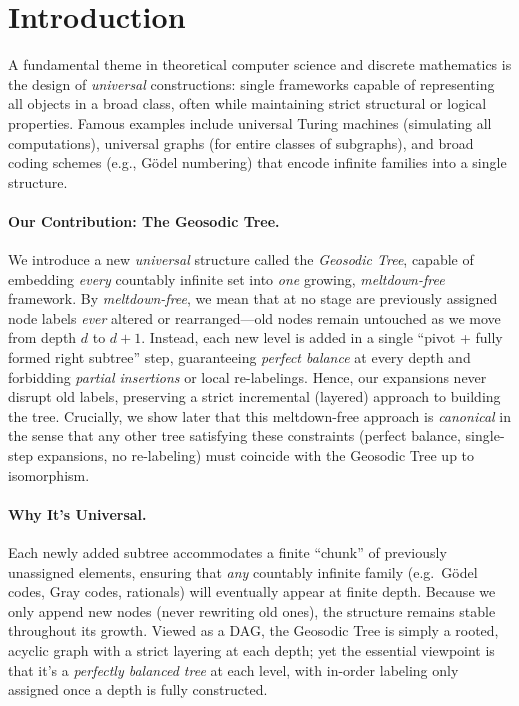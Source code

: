 \documentclass[11pt]{article}
\theoremstyle{definition}
\theoremstyle{remark}
\begin{document}
\section{Introduction}
\label{sec:intro}

A fundamental theme in theoretical computer science and discrete mathematics 
is the design of \emph{universal} constructions: single frameworks capable 
of representing all objects in a broad class, often while maintaining 
strict structural or logical properties. Famous examples include 
universal Turing machines (simulating all computations), universal graphs 
(for entire classes of subgraphs), and broad coding schemes 
(e.g., G\"odel numbering) that encode infinite families into a single structure.

\paragraph{Our Contribution: The Geosodic Tree.}
We introduce a new \emph{universal} structure called the \emph{Geosodic Tree}, 
capable of embedding \emph{every} countably infinite set into \emph{one} 
growing, \emph{meltdown-free} framework. By \emph{meltdown-free}, we mean 
that at no stage are previously assigned node labels \emph{ever} altered 
or rearranged---old nodes remain untouched as we move from depth $d$ 
to $d+1$. Instead, each new level is added in a single ``pivot + fully formed 
right subtree'' step, guaranteeing \emph{perfect balance} at every depth 
and forbidding \emph{partial insertions} or local re-labelings. 
Hence, our expansions never disrupt old labels, preserving a strict 
incremental (layered) approach to building the tree.  Crucially, we show later that this meltdown-free
approach is \emph{canonical} in the sense that any other tree satisfying
these constraints (perfect balance, single-step expansions, no re-labeling)
must coincide with the Geosodic Tree up to isomorphism.

\paragraph{Why It’s Universal.}
Each newly added subtree accommodates a finite ``chunk'' of previously unassigned elements, 
ensuring that \emph{any} countably infinite family 
(e.g.\ G\"odel codes, Gray codes, rationals) 
will eventually appear at finite depth. Because we only append new nodes (never rewriting old ones),
the structure remains stable throughout its growth. Viewed as a DAG, the Geosodic Tree 
is simply a rooted, acyclic graph with a strict layering at each depth; yet the essential 
viewpoint is that it’s a \emph{perfectly balanced tree} at each level, with in-order labeling 
only assigned once a depth is fully constructed.
\end{document}
